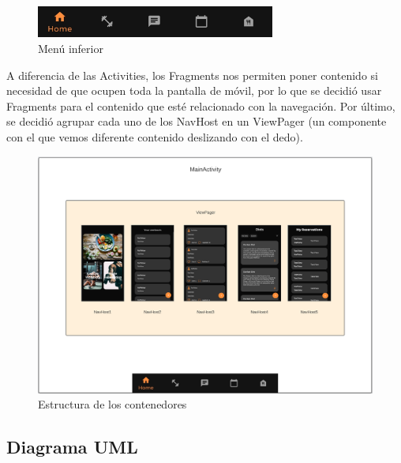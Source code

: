 \documentclass[12pt,a4paper]{article}
\begin{document}
\begin{figure}[h]
  \centering
 \includegraphics[width=0.7\textwidth]{bottom_menu}
 \caption{Menú inferior}
\end{figure}


A diferencia de las Activities, los Fragments nos permiten poner contenido si necesidad de que ocupen toda la pantalla de móvil,
por lo que se decidió usar Fragments para el contenido que esté relacionado con la navegación.
Por último, se decidió agrupar cada uno de los NavHost en un ViewPager (un componente con el que vemos diferente contenido deslizando con el dedo).

\begin{figure}[h]
  \centering
 \includegraphics[width=1\textwidth]{layout_img}
 \caption{Estructura de los contenedores}
\end{figure}

\clearpage


\subsection{Diagrama UML}
\end{document}
